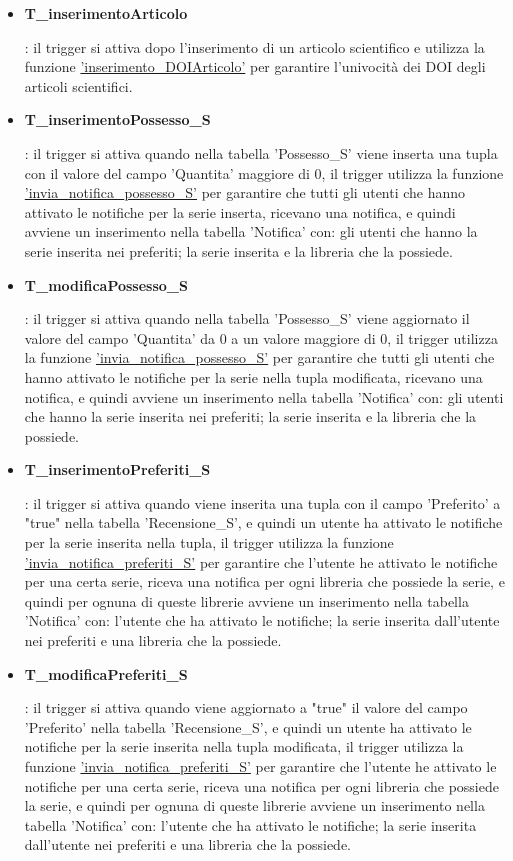 \documentclass{article}
\begin{document}
\begin{itemize}
   \item \hypertarget{t21}{\textbf{T\_inserimentoArticolo}}: il trigger si attiva dopo l'inserimento di un articolo scientifico e utilizza la funzione \hyperlink{f21}{'inserimento\_DOIArticolo'} per garantire l'univocità dei DOI degli articoli scientifici.

   \item \hypertarget{t22}{\textbf{T\_inserimentoPossesso\_S}}: il trigger si attiva quando nella tabella 'Possesso\_S' viene inserta una tupla con il valore del campo 'Quantita' maggiore di 0, il trigger utilizza la funzione \hyperlink{f22}{'invia\_notifica\_possesso\_S'} per garantire che tutti gli utenti che hanno attivato le notifiche per la serie inserta, ricevano una notifica, e quindi avviene un inserimento nella tabella 'Notifica' con: gli utenti che hanno la serie inserita nei preferiti; la serie inserita e la libreria che la possiede.

   \item \hypertarget{t23}{\textbf{T\_modificaPossesso\_S}}: il trigger si attiva quando nella tabella 'Possesso\_S' viene aggiornato il valore del campo 'Quantita' da 0 a un valore maggiore di 0, il trigger utilizza la funzione \hyperlink{f22}{'invia\_notifica\_possesso\_S'} per garantire che tutti gli utenti che hanno attivato le notifiche per la serie nella tupla modificata, ricevano una notifica, e quindi avviene un inserimento nella tabella 'Notifica' con: gli utenti che hanno la serie inserita nei preferiti; la serie inserita e la libreria che la possiede.

   \item \hypertarget{t24}{\textbf{T\_inserimentoPreferiti\_S}}: il trigger si attiva quando viene inserita una tupla con il campo 'Preferito' a "true" nella tabella 'Recensione\_S', e quindi un utente ha attivato le notifiche per la serie inserita nella tupla, il trigger utilizza la funzione \hyperlink{f23}{'invia\_notifica\_preferiti\_S'} per garantire che l'utente he attivato le notifiche per una certa serie, riceva una notifica per ogni libreria che possiede la serie, e quindi per ognuna di queste librerie avviene un inserimento nella tabella 'Notifica' con: l'utente che ha attivato le notifiche; la serie inserita dall'utente nei preferiti e una libreria che la possiede.

   \item \hypertarget{t25}{\textbf{T\_modificaPreferiti\_S}}: il trigger si attiva quando viene aggiornato a "true" il valore del campo 'Preferito' nella tabella 'Recensione\_S', e quindi un utente ha attivato le notifiche per la serie inserita nella tupla modificata, il trigger utilizza la funzione \hyperlink{f23}{'invia\_notifica\_preferiti\_S'} per garantire che l'utente he attivato le notifiche per una certa serie, riceva una notifica per ogni libreria che possiede la serie, e quindi per ognuna di queste librerie avviene un inserimento nella tabella 'Notifica' con: l'utente che ha attivato le notifiche; la serie inserita dall'utente nei preferiti e una libreria che la possiede.


\end{itemize}
\end{document}
